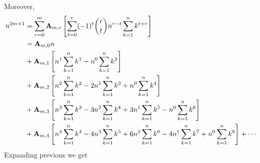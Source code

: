 Moreover,
\begin{equation}
    \begin{split}
        n^{2m+1}
        &= \sum_{r=0}^{m} {\mathbf{A}} \sb{m,r} \left[ \sum_{t=0}^{r} (-1)^t \binom{r}{t} n^{r-t} \sum_{k=1}^{n} k^{t+r} \right] \\
        &= {\mathbf{A}} \sb{m,0} n \\
        &+ {\mathbf{A}} \sb{m,1} \left[ n^{1} \sum_{k=1}^{n} k^{1} - n^{0} \sum_{k=1}^{n} k^{2} \right] \\
        &+ {\mathbf{A}} \sb{m,2} \left[ n^{2} \sum_{k=1}^{n} k^{2} - 2 n^{1} \sum_{k=1}^{n} k^{3} + n^{0} \sum_{k=1}^{n} k^{4}\right] \\
        &+ {\mathbf{A}} \sb{m,3} \left[ n^{3} \sum_{k=1}^{n} k^{3} - 3 n^{2} \sum_{k=1}^{n} k^{4} + 3 n^{1} \sum_{k=1}^{n} k^{5} - n^{0} \sum_{k=1}^{n} k^{6} \right] \\
        &+ {\mathbf{A}} \sb{m,4} \left[ n^{4} \sum_{k=1}^{n} k^{4} - 4 n^{3} \sum_{k=1}^{n} k^{5} + 6 n^{2} \sum_{k=1}^{n} k^{6} - 4 n^{1} \sum_{k=1}^{n} k^{7} + n^{0} \sum_{k=1}^{n} k^{8} \right] + \cdots \\
    \end{split}\label{eq:equation14}
\end{equation}
Expanding previous we get

